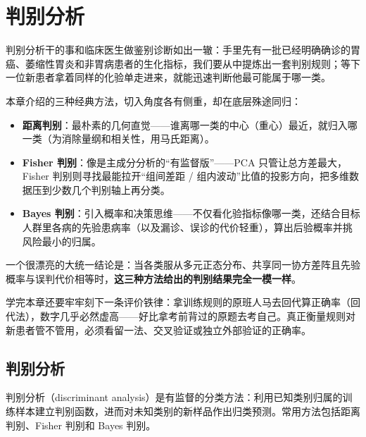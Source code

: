 \chapter{判别分析}
判别分析干的事和临床医生做鉴别诊断如出一辙：手里先有一批已经明确确诊的胃癌、萎缩性胃炎和非胃病患者的生化指标，我们要从中提炼出一套判别规则；等下一位新患者拿着同样的化验单走进来，就能迅速判断他最可能属于哪一类。

本章介绍的三种经典方法，切入角度各有侧重，却在底层殊途同归：
\begin{itemize}
\item \textbf{距离判别}：最朴素的几何直觉——谁离哪一类的中心（重心）最近，就归入哪一类（为消除量纲和相关性，用马氏距离）。
\item \textbf{Fisher 判别}：像是主成分分析的“有监督版”——PCA 只管让总方差最大，Fisher 判别则寻找最能拉开“组间差距 / 组内波动”比值的投影方向，把多维数据压到少数几个判别轴上再分类。
\item \textbf{Bayes 判别}：引入概率和决策思维——不仅看化验指标像哪一类，还结合目标人群里各病的先验患病率（以及漏诊、误诊的代价轻重），算出后验概率并挑风险最小的归属。
\end{itemize}
一个很漂亮的大统一结论是：当各类服从多元正态分布、共享同一协方差阵且先验概率与误判代价相等时，\textbf{这三种方法给出的判别结果完全一模一样}。

学完本章还要牢牢刻下一条评价铁律：拿训练规则的原班人马去回代算正确率（回代法），数字几乎必然虚高——好比拿考前背过的原题去考自己。真正衡量规则对新患者管不管用，必须看留一法、交叉验证或独立外部验证的正确率。
\section{判别分析}
判别分析（discriminant analysis）是有监督的分类方法：利用已知类别归属的训练样本建立判别函数，进而对未知类别的新样品作出归类预测。常用方法包括距离判别、Fisher 判别和 Bayes 判别。
